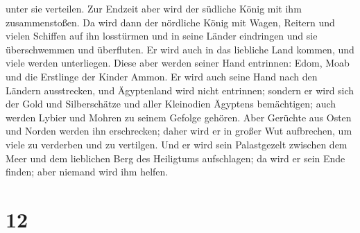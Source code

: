 unter sie verteilen.  Zur Endzeit aber wird der südliche
König mit ihm zusammenstoßen. Da wird dann der nördliche König mit
Wagen, Reitern und vielen Schiffen auf ihn losstürmen und in seine
Länder eindringen und sie überschwemmen und überfluten. 
Er wird auch in das liebliche Land kommen, und viele werden unterliegen.
Diese aber werden seiner Hand entrinnen: Edom, Moab und die Erstlinge
der Kinder Ammon.  Er wird auch seine Hand nach den
Ländern ausstrecken, und Ägyptenland wird nicht entrinnen;
 sondern er wird sich der Gold und Silberschätze und
aller Kleinodien Ägyptens bemächtigen; auch werden Lybier und Mohren zu
seinem Gefolge gehören.  Aber Gerüchte aus Osten und
Norden werden ihn erschrecken; daher wird er in großer Wut aufbrechen,
um viele zu verderben und zu vertilgen.  Und er wird sein
Palastgezelt zwischen dem Meer und dem lieblichen Berg des Heiligtums
aufschlagen; da wird er sein Ende finden; aber niemand wird ihm helfen.

\hypertarget{section-11}{%
\section{12}\label{section-11}}

